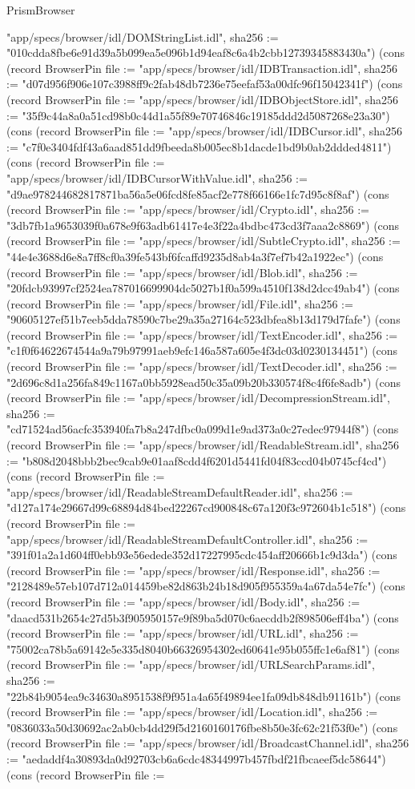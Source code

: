 \begin{lexlean}{PrismBrowser}
\begin{semanticmodule}
{"app/specs/browser/idl/DOMStringList.idl", sha256 := "010cdda8fbe6e91d39a5b099ea5e096b1d94eaf8c6a4b2cbb12739345883430a"}) (cons (record BrowserPin {file := "app/specs/browser/idl/IDBTransaction.idl", sha256 := "d07d956f906e107c3988ff9c2fab48db7236e75eefaf53a00dfc96f15042341f"}) (cons (record BrowserPin {file := "app/specs/browser/idl/IDBObjectStore.idl", sha256 := "35f9c44a8a0a51cd98b0c44d1a55f89e70746846c19185ddd2d5087268e23a30"}) (cons (record BrowserPin {file := "app/specs/browser/idl/IDBCursor.idl", sha256 := "c7f0e3404fdf43a6aad851dd9fbeeda8b005ec8b1dacde1bd9b0ab2ddded4811"}) (cons (record BrowserPin {file := "app/specs/browser/idl/IDBCursorWithValue.idl", sha256 := "d9ae978244682817871ba56a5e06fcd8fe85acf2e778f66166e1fc7d95c8f8af"}) (cons (record BrowserPin {file := "app/specs/browser/idl/Crypto.idl", sha256 := "3db7fb1a9653039f0a678e9f63adb61417e4e3f22a4bdbc473cd3f7aaa2c8869"}) (cons (record BrowserPin {file := "app/specs/browser/idl/SubtleCrypto.idl", sha256 := "44e4e3688d6e8a7ff8cf0a39fe543bf6fcaffd9235d8ab4a3f7ef7b42a1922ec"}) (cons (record BrowserPin {file := "app/specs/browser/idl/Blob.idl", sha256 := "20fdcb93997cf2524ea787016699904dc5027b1f0a599a4510f138d2dcc49ab4"}) (cons (record BrowserPin {file := "app/specs/browser/idl/File.idl", sha256 := "90605127ef51b7eeb5dda78590c7be29a35a27164c523dbfea8b13d179d7fafe"}) (cons (record BrowserPin {file := "app/specs/browser/idl/TextEncoder.idl", sha256 := "c1f0f64622674544a9a79b97991aeb9efc146a587a605e4f3dc03d0230134451"}) (cons (record BrowserPin {file := "app/specs/browser/idl/TextDecoder.idl", sha256 := "2d696c8d1a256fa849c1167a0bb5928ead50c35a09b20b330574f8c4f6fe8adb"}) (cons (record BrowserPin {file := "app/specs/browser/idl/DecompressionStream.idl", sha256 := "cd71524ad56acfc353940fa7b8a247dfbc0a099d1e9ad373a0c27edec97944f8"}) (cons (record BrowserPin {file := "app/specs/browser/idl/ReadableStream.idl", sha256 := "b808d2048bbb2bec9cab9e01aaf8cdd4f6201d5441fd04f83ccd04b0745cf4cd"}) (cons (record BrowserPin {file := "app/specs/browser/idl/ReadableStreamDefaultReader.idl", sha256 := "d127a174e29667d99c68894d84bed22267cd900848c67a120f3c972604b1c518"}) (cons (record BrowserPin {file := "app/specs/browser/idl/ReadableStreamDefaultController.idl", sha256 := "391f01a2a1d604ff0ebb93e56edede352d17227995cdc454aff20666b1c9d3da"}) (cons (record BrowserPin {file := "app/specs/browser/idl/Response.idl", sha256 := "2128489e57eb107d712a014459be82d863b24b18d905f955359a4a67da54e7fc"}) (cons (record BrowserPin {file := "app/specs/browser/idl/Body.idl", sha256 := "daacd531b2654c27d5b3f905950157e9f89ba5d070c6aecddb2f898506eff4ba"}) (cons (record BrowserPin {file := "app/specs/browser/idl/URL.idl", sha256 := "75002ca78b5a69142e5e335d8040b66326954302ed60641e95b055ffc1e6af81"}) (cons (record BrowserPin {file := "app/specs/browser/idl/URLSearchParams.idl", sha256 := "22b84b9054ea9c34630a8951538f9f951a4a65f49894ee1fa09db848db91161b"}) (cons (record BrowserPin {file := "app/specs/browser/idl/Location.idl", sha256 := "0836033a50d30692ac2ab0cb4dd29f5d2160160176fbe8b50e3fc62c21f53f0e"}) (cons (record BrowserPin {file := "app/specs/browser/idl/BroadcastChannel.idl", sha256 := "aedaddf4a30893da0d92703cb6a6cdc48344997b457fbdf21fbcaeef5dc58644"}) (cons (record BrowserPin {file := }
\end{semanticmodule}
\end{lexlean}
